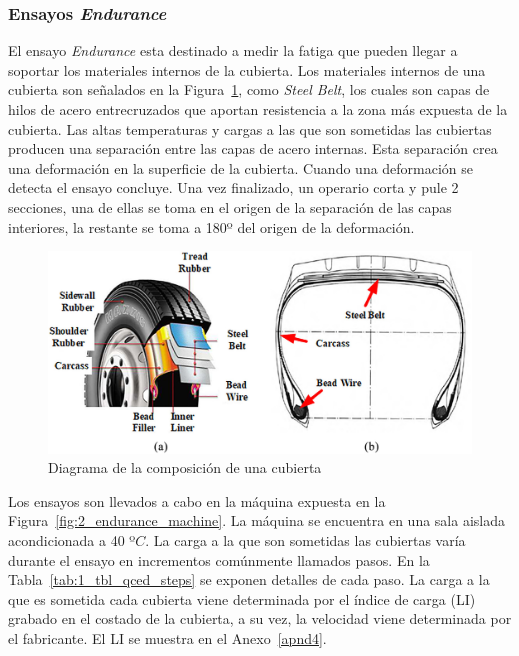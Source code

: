 \subsubsection{Ensayos \textit{Endurance}}
El ensayo \textit{Endurance} esta destinado a medir la fatiga
que pueden llegar a soportar los materiales internos de la cubierta.
Los materiales internos de una cubierta son señalados
en la Figura~\ref{fig:2_tirecs}, como \textit{Steel Belt},
los cuales son capas de hilos de acero entrecruzados que
aportan resistencia a la zona más expuesta de la cubierta.
Las altas temperaturas y cargas a las que son sometidas las cubiertas
producen una separación entre las capas de acero internas.
Esta separación crea una deformación en la superficie de la cubierta.
Cuando una deformación se detecta el ensayo concluye.
Una vez finalizado, un operario corta y pule 2 secciones,
una de ellas se toma en el origen de la separación de las capas interiores,
la restante se toma a 180º del origen de la deformación.

\begin{figure}[H]
	\begin{center}
		\includegraphics[width=\textwidth]{fig/2_tirecs}
	\end{center}
	\caption{Diagrama de la composición de una cubierta}
	\label{fig:2_tirecs}
\end{figure}

Los ensayos son llevados a cabo en la máquina expuesta
en la Figura~\ref{fig:2_endurance_machine}.
La máquina se encuentra en una sala aislada acondicionada a 40 º$C$.
La carga a la que son sometidas las cubiertas varía durante el ensayo
en incrementos comúnmente llamados pasos.
En la Tabla~\ref{tab:1_tbl_qced_steps} se exponen detalles de cada paso.
La carga a la que es sometida cada cubierta viene determinada
por el índice de carga (LI) grabado en el costado de la cubierta,
a su vez, la velocidad viene determinada por el fabricante.
El LI se muestra en el Anexo~\ref{apnd4}.

